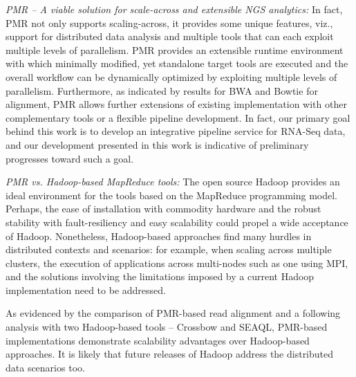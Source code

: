 \documentclass{acm_proc_article-sp}
\begin{document}

\textit{PMR -- A viable solution for scale-across and extensible NGS
  analytics:} In fact, PMR not only supports scaling-across, it
provides some unique features, viz., support for distributed data
analysis and multiple tools that can each exploit multiple levels of
parallelism. %
PMR provides an extensible runtime environment with which minimally
modified, yet standalone target tools are executed and the overall
workflow can be dynamically optimized by exploiting multiple levels of
parallelism. Furthermore, as indicated by results for BWA and Bowtie
for alignment, PMR allows further extensions of existing
implementation with other complementary tools or a flexible pipeline
development.  In fact, our primary goal behind this work is to develop
an integrative pipeline service for RNA-Seq data, and our development
presented in this work is indicative of preliminary progresses toward
such a goal.

\textit{PMR vs. Hadoop-based MapReduce tools: }The open source Hadoop
provides an ideal environment for the tools based on the MapReduce
programming model.  Perhaps, the ease of installation with commodity
hardware and the robust stability with fault-resiliency and easy
scalability could propel a wide acceptance of Hadoop.  Nonetheless,
Hadoop-based approaches find many hurdles in distributed contexts and
scenarios: for example, when scaling across multiple
clusters\cite{weissman-mr-11}, the execution of applications across
multi-nodes such as one using MPI, and the solutions involving the
limitations imposed by a current Hadoop implementation need to be
addressed.


As evidenced by the comparison of PMR-based read alignment and a
following analysis with two Hadoop-based tools -- Crossbow and SEAQL,
PMR-based implementations demonstrate scalability advantages over
Hadoop-based approaches. It is likely that future releases of Hadoop
address the distributed data scenarios too.
\end{document}
